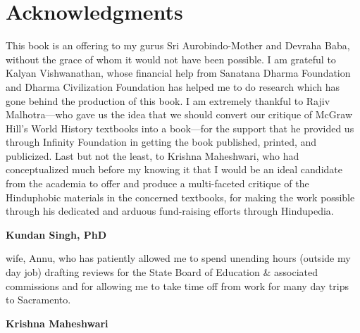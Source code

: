 \chapter*{Acknowledgments}

This book is an offering to my gurus Sri Aurobindo-Mother and Devraha Baba, without the grace of whom it would not have been possible. I am grateful to Kalyan Vishwanathan, whose financial help from Sanatana Dharma Foundation and Dharma Civilization Foundation has helped me to do research which has gone behind the production of this book. I am extremely thankful to Rajiv Malhotra—who gave us the idea that we should convert our critique of McGraw Hill’s World History textbooks into a book—for the support that he provided us through Infinity Foundation in getting the book published, printed, and publicized. Last but not the least, to Krishna Maheshwari, who had conceptualized much before my knowing it that I would be an ideal candidate from the academia to offer and produce a multi-faceted critique of the Hinduphobic materials in the concerned textbooks, for making the work possible through his dedicated and arduous fund-raising efforts through Hindupedia.

\begin{flushright}
\textbf{Kundan Singh, PhD}
\end{flushright}


wife, Annu, who has patiently allowed me to spend unending hours (outside my day job) drafting reviews for the State Board of Education \& associated commissions and for allowing me to take time off from work for many day trips to Sacramento.

\begin{flushright}
\textbf{Krishna Maheshwari}
\end{flushright}
